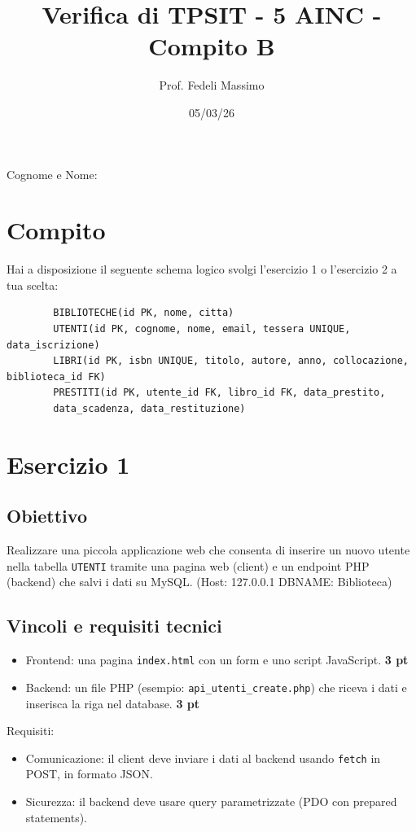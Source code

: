 \documentclass[a4paper,12pt]{article}
\title{Verifica di TPSIT - 5 AINC - Compito B}
\author{Prof. Fedeli Massimo}
\date{05/03/26}
\begin{document}
	
	\maketitle
		Cognome e Nome: 
	\section*{Compito}
	
	Hai a disposizione il seguente schema logico svolgi l'esercizio 1 o l'esercizio 2 a tua scelta:
	
	\begin{verbatim}
		BIBLIOTECHE(id PK, nome, citta)
		UTENTI(id PK, cognome, nome, email, tessera UNIQUE, data_iscrizione)
		LIBRI(id PK, isbn UNIQUE, titolo, autore, anno, collocazione, biblioteca_id FK)
		PRESTITI(id PK, utente_id FK, libro_id FK, data_prestito,
		data_scadenza, data_restituzione)
	\end{verbatim}
	
	\section*{Esercizio 1}
	
	\subsection*{Obiettivo}
	
	Realizzare una piccola applicazione web che consenta di inserire un nuovo utente
	nella tabella \texttt{UTENTI} tramite una pagina web (client) e un endpoint PHP
	(backend) che salvi i dati su MySQL. (Host: 127.0.0.1  DBNAME: Biblioteca)
	
	\subsection*{Vincoli e requisiti tecnici}
	
	\begin{itemize}
		\item Frontend: una pagina \texttt{index.html} con un form e uno script
		JavaScript. \textbf{3 pt}
		\item Backend: un file PHP (esempio: \texttt{api\_utenti\_create.php}) che
		riceva i dati e inserisca la riga nel database. \textbf{3 pt}
	\end{itemize}
	
	Requisiti:
	\begin{itemize}
		\item Comunicazione: il client deve inviare i dati al backend usando
		\texttt{fetch} in POST, in formato JSON.
		\item Sicurezza: il backend deve usare query parametrizzate (PDO con prepared
		statements). 
	\end{itemize}
	
\end{document}
